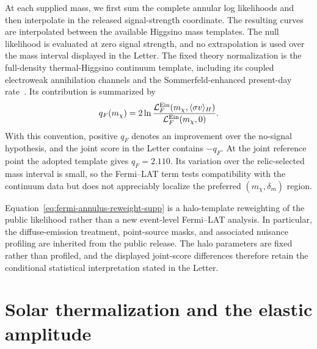 \documentclass[%
  aps,
  prl,
  reprint,
  superscriptaddress,
  amsmath,
  amssymb,
  longbibliography
]{revtex4-2}
\begin{document}
{At each supplied mass, we first sum the complete annular log likelihoods and
then interpolate in the released signal-strength coordinate.  The resulting
curves are interpolated between the available Higgsino mass templates.  The
null likelihood is evaluated at zero signal strength, and no extrapolation
is used over the mass interval displayed in the Letter.  The fixed theory
normalization is the full-density thermal-Higgsino continuum template,
including its coupled electroweak annihilation channels and the
Sommerfeld-enhanced present-day rate~\cite{Hisano:2004ds,Hisano:2006nn,
Dessert:2022evk}.  Its contribution is summarized by
\begin{equation}
 q_F(m_\chi)=2\ln\frac{
 {\cal L}^{\rm Ein}_F(m_\chi,\langle\sigma v\rangle_H)}
 {{\cal L}^{\rm Ein}_F(m_\chi,0)}.
 \label{eq:fermi-test-statistic-supp}
\end{equation}
With this convention, positive \(q_F\) denotes an improvement over the
no-signal hypothesis, and the joint score in the Letter contains
\(-q_F\).  At the joint reference point the adopted template gives
\({q_F=2.110}\).  Its variation over the relic-selected mass interval is small,
so the Fermi--LAT term tests compatibility with the continuum data but does
not appreciably localize the preferred \((m_\chi,\delta_m)\) region.

Equation~\eqref{eq:fermi-annulus-reweight-supp} is a halo-template
reweighting of the public likelihood rather than a new event-level
Fermi--LAT analysis.  In particular, the diffuse-emission treatment,
point-source masks, and associated nuisance profiling are inherited from
the public release.  The halo parameters are fixed rather than profiled, and
the displayed joint-score differences therefore retain the conditional
statistical interpretation stated in the Letter.


\clearpage

\section{Solar thermalization and the elastic amplitude}
\label{sec:elastic-thermalization-supp}

}
\end{document}
